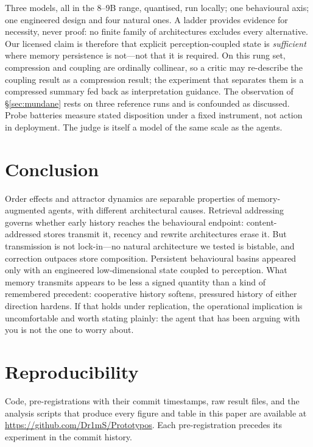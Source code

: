\documentclass[11pt]{article}
\begin{document}
Three models, all in the 8--9B range, quantised, run locally; one behavioural axis;
one engineered design and four natural ones. A ladder provides evidence for necessity,
never proof: no finite family of architectures excludes every alternative. Our licensed
claim is therefore that explicit perception-coupled state is \emph{sufficient} where
memory persistence is not---not that it is required. On this rung set, compression and
coupling are ordinally collinear, so a critic may re-describe the coupling result as a
compression result; the experiment that separates them is a compressed summary fed back
as interpretation guidance. The observation of \S\ref{sec:mundane} rests on three
reference runs and is confounded as discussed. Probe batteries measure stated
disposition under a fixed instrument, not action in deployment. The judge is itself a
model of the same scale as the agents.

\section{Conclusion}

Order effects and attractor dynamics are separable properties of memory-augmented
agents, with different architectural causes. Retrieval addressing governs whether early
history reaches the behavioural endpoint: content-addressed stores transmit it,
recency and rewrite architectures erase it. But transmission is not lock-in---no
natural architecture we tested is bistable, and correction outpaces store composition.
Persistent behavioural basins appeared only with an engineered low-dimensional state
coupled to perception. What memory transmits appears to be less a signed quantity than
a kind of remembered precedent: cooperative history softens, pressured history of
either direction hardens. If that holds under replication, the operational implication
is uncomfortable and worth stating plainly: the agent that has been arguing with you is
not the one to worry about.

\section*{Reproducibility}

Code, pre-registrations with their commit timestamps, raw result files, and the
analysis scripts that produce every figure and table in this paper are available at
\url{https://github.com/Dr1mS/Prototypos}. Each pre-registration precedes its experiment in the commit
history.
\end{document}

